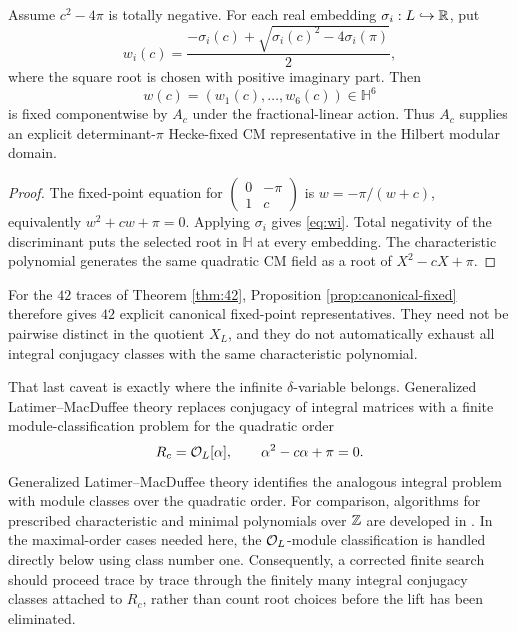 \begin{proposition}\label{prop:canonical-fixed}
Assume $c^2-4\pi$ is totally negative. For each real embedding $\sigma_i:L\hookrightarrow\mathbb R$, put
\begin{equation}\label{eq:wi}
 w_i(c)=\frac{-\sigma_i(c)+\sqrt{\sigma_i(c)^2-4\sigma_i(\pi)}}{2},
\end{equation}
where the square root is chosen with positive imaginary part. Then
\[
 w(c)=(w_1(c),\ldots,w_6(c))\in\mathbb H^6
\]
is fixed componentwise by $A_c$ under the fractional-linear action. Thus $A_c$ supplies an explicit determinant-$\pi$ Hecke-fixed CM representative in the Hilbert modular domain.
\end{proposition}
\begin{proof}
The fixed-point equation for
$\left(\begin{smallmatrix}0&-\pi\\1&c\end{smallmatrix}\right)$ is
$w=-\pi/(w+c)$, equivalently $w^2+cw+\pi=0$. Applying $\sigma_i$ gives \eqref{eq:wi}. Total negativity of the discriminant puts the selected root in $\mathbb H$ at every embedding. The characteristic polynomial generates the same quadratic CM field as a root of $X^2-cX+\pi$.
\end{proof}

For the $42$ traces of Theorem \ref{thm:42}, Proposition \ref{prop:canonical-fixed} therefore gives $42$ explicit canonical fixed-point representatives. They need not be pairwise distinct in the quotient $X_L$, and they do not automatically exhaust all integral conjugacy classes with the same characteristic polynomial.

That last caveat is exactly where the infinite $\delta$-variable belongs. Generalized Latimer--MacDuffee theory replaces conjugacy of integral matrices with a finite module-classification problem for the quadratic order
\[
 R_c=\mathcal O_L[\alpha],\qquad \alpha^2-c\alpha+\pi=0.
\]
Generalized Latimer--MacDuffee theory identifies the analogous integral problem with module classes over the quadratic order.  For comparison, algorithms for prescribed characteristic and minimal polynomials over $\mathbb Z$ are developed in \cite{Marseglia2025}.  In the maximal-order cases needed here, the $\mathcal O_L$-module classification is handled directly below using class number one. Consequently, a corrected finite search should proceed trace by trace through the finitely many integral conjugacy classes attached to $R_c$, rather than count root choices before the lift has been eliminated.


